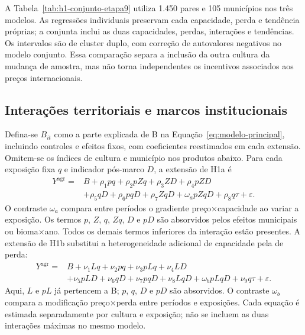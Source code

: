 
\FloatBarrier

A Tabela~\ref{tab:h1-conjunto-etapa9} utiliza 1.450 pares e 105 municípios nos três modelos. As regressões individuais preservam cada capacidade, perda e tendência próprias; a conjunta inclui as duas capacidades, perdas, interações e tendências. Os intervalos são de cluster duplo, com correção de autovalores negativos no modelo conjunto. Essa comparação separa a inclusão da outra cultura da mudança de amostra, mas não torna independentes os incentivos associados aos preços internacionais.


\FloatBarrier

\subsection{Interações territoriais e marcos institucionais}

Defina-se $B_{it}$ como a parte explicada de B na Equação~\eqref{eq:modelo-principal}, incluindo controles e efeitos fixos, com coeficientes reestimados em cada extensão. Omitem-se os índices de cultura e município nos produtos abaixo. Para cada exposição fixa $q$ e indicador pós-marco $D$, a extensão de H1a é
\begin{equation}
\begin{aligned}
Y^{\mathrm{agr}}={}&B+\rho_1pq+\rho_2pZq+\rho_3ZD+\rho_4pZD\\
&+\rho_5qD+\rho_6pqD+\rho_7ZqD+\omega_a pZqD
+\rho_8q\tau+\varepsilon.
\end{aligned}
\label{eq:instituicoes-h1a}
\end{equation}
O contraste $\omega_a$ compara entre períodos o gradiente preço×capacidade ao variar a exposição. Os termos $p$, $Z$, $q$, $Zq$, $D$ e $pD$ são absorvidos pelos efeitos municipais ou bioma×ano. Todos os demais termos inferiores da interação estão presentes. A extensão de H1b substitui a heterogeneidade adicional de capacidade pela de perda:
\begin{equation}
\begin{aligned}
Y^{\mathrm{agr}}={}&B+\nu_1Lq+\nu_2pq+\nu_3pLq+\nu_4LD\\
&+\nu_5pLD+\nu_6qD+\nu_7pqD+\nu_8LqD
+\omega_b pLqD+\nu_9q\tau+\varepsilon.
\end{aligned}
\label{eq:instituicoes-h1b}
\end{equation}
Aqui, $L$ e $pL$ já pertencem a B; $p$, $q$, $D$ e $pD$ são absorvidos. O contraste $\omega_b$ compara a modificação preço×perda entre períodos e exposições. Cada equação é estimada separadamente por cultura e exposição; não se incluem as duas interações máximas no mesmo modelo.

